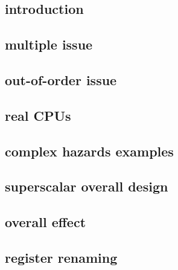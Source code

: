
\subsection{introduction}

\subsection{multiple issue}


\subsection{out-of-order issue}


\subsection{real CPUs}


\subsection{complex hazards examples}

\subsection{superscalar overall design}



\subsection{overall effect}


%
%

\subsection{register renaming}

